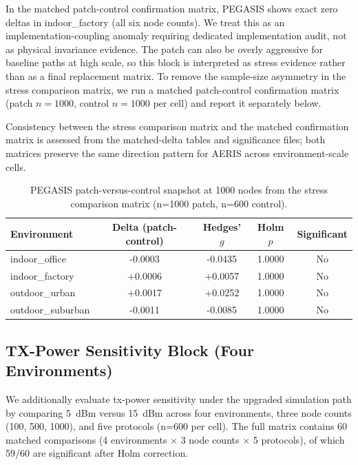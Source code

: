 ﻿\documentclass[sensors,article,submit,moreauthors,pdftex]{Definitions/mdpi}
\begin{document}
In the matched patch-control confirmation matrix, PEGASIS shows exact zero deltas in indoor\_factory (all six node counts). We treat this as an implementation-coupling anomaly requiring dedicated implementation audit, not as physical invariance evidence. The patch can also be overly aggressive for baseline paths at high scale, so this block is interpreted as stress evidence rather than as a final replacement matrix. To remove the sample-size asymmetry in the stress comparison matrix, we run a matched patch-control confirmation matrix (patch \(n=1000\), control \(n=1000\) per cell) and report it separately below.

Consistency between the stress comparison matrix and the matched confirmation matrix is assessed from the matched-delta tables and significance files; both matrices preserve the same direction pattern for AERIS across environment-scale cells.

\begin{table}[H]
\caption{PEGASIS patch-versus-control snapshot at 1000 nodes from the stress comparison matrix (n=1000 patch, n=600 control).}
\label{tab:s9_pegasis_1000}
\centering
\begin{tabular}{lcccc}
\toprule
Environment & Delta (patch-control) & Hedges' $g$ & Holm $p$ & Significant \\
\midrule
indoor\_office    & -0.0003 & -0.0435 & 1.0000 & No \\
indoor\_factory   & +0.0006 & +0.0057 & 1.0000 & No \\
outdoor\_urban    & +0.0017 & +0.0252 & 1.0000 & No \\
outdoor\_suburban & -0.0011 & -0.0085 & 1.0000 & No \\
\bottomrule
\end{tabular}
\end{table}

\subsection{TX-Power Sensitivity Block (Four Environments)}
We additionally evaluate tx-power sensitivity under the upgraded simulation path by comparing \SI{5}{dBm} versus \SI{15}{dBm} across four environments, three node counts (100, 500, 1000), and five protocols (n=600 per cell). The full matrix contains 60 matched comparisons (4 environments $\times$ 3 node counts $\times$ 5 protocols), of which 59/60 are significant after Holm correction.
\end{document}
